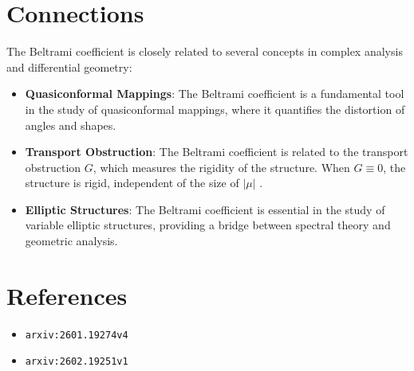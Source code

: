 \documentclass[11pt,a4paper]{article}
\begin{document}
\section{Connections}
The Beltrami coefficient is closely related to several concepts in complex analysis and differential geometry:

\begin{itemize}
\item \textbf{Quasiconformal Mappings}: The Beltrami coefficient is a fundamental tool in the study of quasiconformal mappings, where it quantifies the distortion of angles and shapes.

\item \textbf{Transport Obstruction}: The Beltrami coefficient is related to the transport obstruction $G$, which measures the rigidity of the structure. When $G \equiv 0$, the structure is rigid, independent of the size of $|\mu|$ \cite{2602.19251v1}.

\item \textbf{Elliptic Structures}: The Beltrami coefficient is essential in the study of variable elliptic structures, providing a bridge between spectral theory and geometric analysis.
\end{itemize}

\section{References}
\begin{itemize}
    \item \texttt{arxiv:2601.19274v4}
    \item \texttt{arxiv:2602.19251v1}
\end{itemize}
\end{document}
